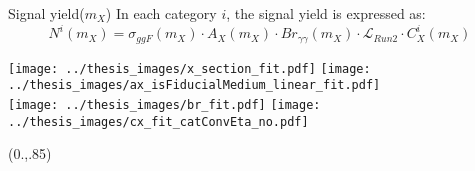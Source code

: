 \documentclass[10pt,UKenglish, leqno, xcolor = dvipsnames]{beamer}
\begin{document}
		\begin{frame}{Signal yield($m_X$)}
			\vfill
			In each category $i$, the signal yield is expressed as:
			$$
			N^i(m_X) = \sigma_{ggF}(m_X) \cdot A_X(m_X) \cdot Br_{\gamma\gamma}(m_X) \cdot \mathcal{L}_{Run2} \cdot C_X^i(m_X)
			$$
			\begin{center}
				\texttt{[image: ../thesis\_images/x\_section\_fit.pdf]}
				\texttt{[image: ../thesis\_images/ax\_isFiducialMedium\_linear\_fit.pdf]}\\
				\texttt{[image: ../thesis\_images/br\_fit.pdf]}			
				\texttt{[image: ../thesis\_images/cx\_fit\_catConvEta\_no.pdf]}
			\end{center}
			\vfill
			\begin{textblock}{1}(0.,.85)
				\begin{figure}
				\end{figure}
			\end{textblock}
		\end{frame}
	
\end{document}
